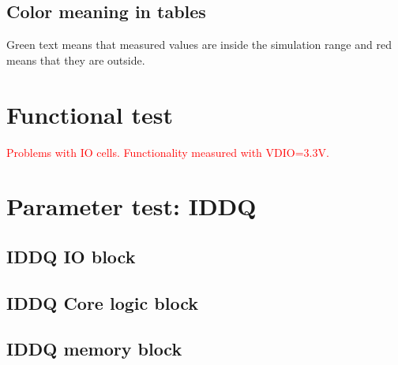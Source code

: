 
\section{Color meaning in tables}

Green text means that measured values are inside the simulation range and red means that they are outside. 




\chapter{Functional test}

\renewcommand{\VDIO}{3.3}
\textcolor{red}{Problems with IO cells. Functionality measured with VDIO=3.3V.}


\newpage

\newpage

\newpage

\renewcommand{\VDIO}{5}


\chapter{Parameter test: IDDQ}


 
\newpage 
\section{IDDQ IO block}


\newpage


\newpage



\newpage
\section{IDDQ Core logic block}


\newpage


\newpage


\newpage



\newpage
\section{IDDQ memory block}


